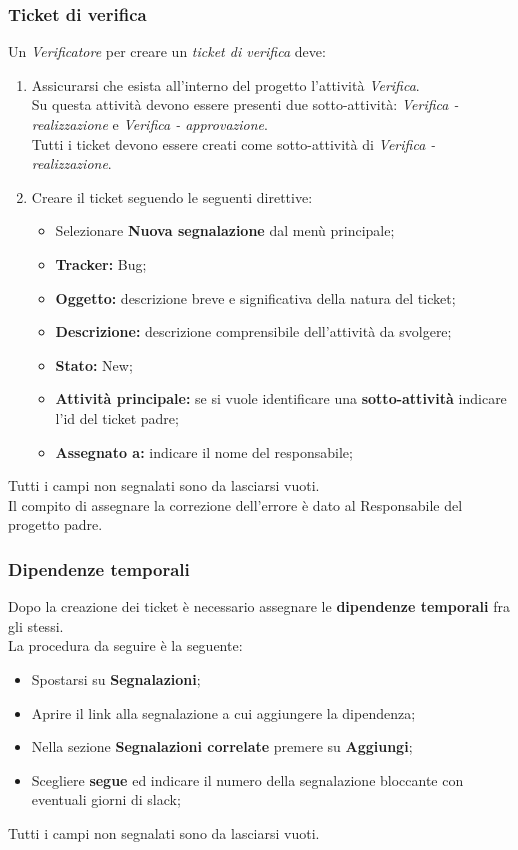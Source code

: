       \subsubsection{Ticket di verifica}
        Un \emph{Verificatore} per creare un \emph{ticket di verifica} deve:
        \begin{enumerate}
          \item Assicurarsi che esista all'interno del progetto l'attività \emph{Verifica}.\\
          Su questa attività devono essere presenti due sotto-attività: \emph{Verifica - realizzazione} e \emph{Verifica - approvazione}.\\
          Tutti i ticket devono essere creati come sotto-attività di \emph{Verifica - realizzazione}.
          \item Creare il ticket seguendo le seguenti direttive:
          \bgroup
            \begin{itemize}
              \item Selezionare \textbf{Nuova segnalazione} dal menù principale;
              \item \textbf{Tracker: }Bug;
              \item \textbf{Oggetto: }descrizione breve e significativa della natura del ticket;
              \item \textbf{Descrizione: }descrizione comprensibile dell'attività da svolgere;
              \item \textbf{Stato: }New;
              \item \textbf{Attività principale: }se si vuole identificare una \textbf{sotto-attività} indicare l'id del ticket padre;
              \item \textbf{Assegnato a: }indicare il nome del responsabile;
            \end{itemize}
          \egroup
        \end{enumerate}
      Tutti i campi non segnalati sono da lasciarsi vuoti.\\
      Il compito di assegnare la correzione dell'errore è dato al Responsabile del progetto padre.
    \subsubsection{Dipendenze temporali}
      Dopo la creazione dei ticket è necessario assegnare le \textbf{dipendenze temporali} fra gli stessi.\\
      La procedura da seguire è la seguente:
      \begin{itemize}
        \item Spostarsi su \textbf{Segnalazioni};
        \item Aprire il link alla segnalazione a cui aggiungere la dipendenza;
        \item Nella sezione \textbf{Segnalazioni correlate} premere su \textbf{Aggiungi};
        \item Scegliere \textbf{segue} ed indicare il numero della segnalazione bloccante con eventuali giorni di slack;
      \end{itemize}
      Tutti i campi non segnalati sono da lasciarsi vuoti.
